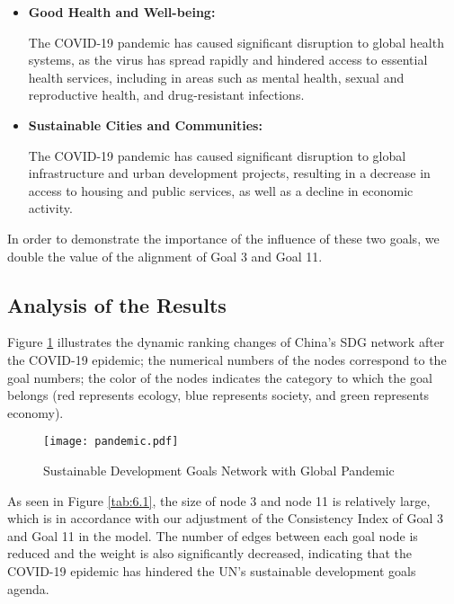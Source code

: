 \documentclass[12pt]{article}  %
\begin{document}
\begin{itemize}
   \setlength{\itemsep}{0pt}
\setlength{\parsep}{0pt}
\setlength{\parskip}{0pt}
    \item \begin{itshape}
        \textbf{Good Health and Well-being:}
    \end{itshape}  The COVID-19 pandemic has caused significant disruption to global health systems, as the virus has spread rapidly and hindered access to essential health services, including in areas such as mental health, sexual and reproductive health, and drug-resistant infections.  \item \begin{itshape}
        \textbf{Sustainable Cities and Communities:}
    \end{itshape} The COVID-19 pandemic has caused significant disruption to global infrastructure and urban development projects, resulting in a decrease in access to housing and public services, as well as a decline in economic activity. 
\end{itemize}

In order to demonstrate the importance of the influence of these two goals, we double the value of the alignment of Goal 3 and Goal 11. 


\subsection{Analysis of the Results}

Figure \ref{fig:6.1} illustrates the dynamic ranking changes of China’s SDG network after the COVID-19 epidemic; the numerical numbers of the nodes correspond to the goal numbers; the color of the nodes indicates the category to which the goal belongs (red represents ecology, blue represents society, and green represents economy).

\begin{figure}[htbp]
\centering
\texttt{[image: pandemic.pdf]}
\caption{Sustainable Development Goals Network with Global Pandemic}\label{fig:6.1}
\end{figure}


As seen in Figure \ref{tab:6.1}, the size of node 3 and node 11 is relatively large, which is in accordance with our adjustment of the Consistency Index of Goal 3 and Goal 11 in the model. The number of edges between each goal node is reduced and the weight is also significantly decreased, indicating that the COVID-19 epidemic has hindered the UN's sustainable development goals agenda.
\end{document}
